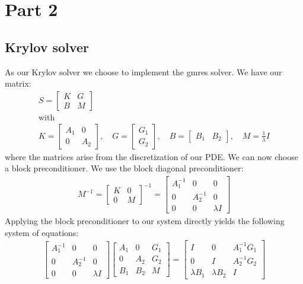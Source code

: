 \section{Part 2}
\subsection{Krylov solver}
As our Krylov solver we choose to implement the gmres solver. We have our matrix:
\begin{align}
    S = \begin{bmatrix}
        K & G\\
        B & M
    \end{bmatrix}\\
    \text{with} \nonumber\\
    K = \begin{bmatrix}
        A_1 & 0 \\
        0 & A_2
    \end{bmatrix}, \quad G = \begin{bmatrix}
        G_1 \\ G_2 \end{bmatrix}, \quad B = \begin{bmatrix}
        B_1 & B_2 \end{bmatrix}, \quad M = \frac{1}{\lambda} I
\end{align}
where the matrices arise from the discretization of our PDE. We can now choose a block preconditioner. We use the block diagonal preconditioner:
\begin{align}
    M^{-1} = \begin{bmatrix}
        K & 0\\
        0 & M
    \end{bmatrix}^{-1} = \begin{bmatrix}
        A_1^{-1} & 0 & 0\\
        0 & A_2^{-1} & 0\\
        0 & 0&  \lambda I
    \end{bmatrix}
\end{align}
Applying the block preconditioner to our system directly yields the following system of equations:
\begin{align}
    \begin{bmatrix}
        A_1^{-1} & 0 & 0\\
        0 & A_2^{-1} & 0\\
        0 & 0&  \lambda I
    \end{bmatrix} \begin{bmatrix}
        A_1 & 0 & G_1\\
        0 & A_2 & G_2\\
        B_1 & B_2 & M
    \end{bmatrix} = \begin{bmatrix}
        I & 0 & A_1^{-1} G_1\\
        0 & I & A_2^{-1} G_2\\
        \lambda B_1 & \lambda B_2 & I
    \end{bmatrix}
\end{align}
